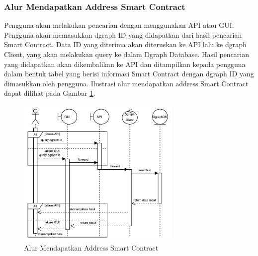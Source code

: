 \subsubsection{Alur Mendapatkan Address Smart Contract}

Pengguna akan melakukan pencarian dengan menggunakan API atau GUI. Pengguna akan memasukkan dgraph ID yang didapatkan dari hasil pencarian Smart Contract. Data ID yang diterima akan diteruskan ke API lalu ke dgraph Client, yang akan melakukan query ke dalam Dgraph Database. Hasil pencarian yang didapatkan akan dikembalikan ke API dan ditampilkan kepada pengguna dalam bentuk tabel yang berisi informasi Smart Contract dengan dgraph ID yang dimasukkan oleh pengguna. Ilustrasi alur mendapatkan address Smart Contract dapat dilihat pada Gambar \ref{image:alur-mendapatkan-address-smart-contract}.

\begin{figure}[ht]
	\centering
	\includegraphics[width=0.7\textwidth]{resources/chapter-3/sequence-2.png}
	\caption{Alur Mendapatkan Address Smart Contract}
	\label{image:alur-mendapatkan-address-smart-contract}
\end{figure}






